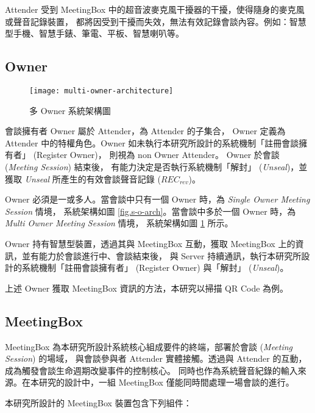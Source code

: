     Attender 受到 MeetingBox 中的超音波麥克風干擾器的干擾，使得隨身的麥克風或聲音記錄裝置，
都將因受到干擾而失效，無法有效記錄會談內容。例如：智慧型手機、智慧手錶、筆電、平板、智慧喇叭等。


\subsection{Owner}

\begin{figure}[H]
    \centering
    \texttt{[image: multi-owner-architecture]}
    \caption{多 Owner 系統架構圖}
    \label{fig.m-o-arch}
\end{figure}

    會談擁有者 Owner 屬於 Attender，為 Attender 的子集合，
Owner 定義為 Attender 中的特權角色。Owner 如未執行本研究所設計的系統機制「註冊會談擁有者」 (Register Owner)，
則視為 non Owner Attender。 Owner 於會談 ({\it Meeting Session}) 結束後，
有能力決定是否執行系統機制「解封」 ({\it Unseal})，並獲取 {\it Unseal} 所產生的有效會談聲音記錄 ($REC_{rev}$)。

    Owner 必須是一或多人。當會談中只有一個 Owner 時，為 {\it Single Owner Meeting Session} 情境，
系統架構如圖 \ref{fig.s-o-arch}。當會談中多於一個 Owner 時，為 {\it Multi Owner Meeting Session} 情境，
系統架構如圖 \ref{fig.m-o-arch} 所示。

    Owner 持有智慧型裝置，透過其與 MeetingBox 互動，獲取 MeetingBox 上的資訊，並有能力於會談進行中、會談結束後，
與 Server 持續通訊，執行本研究所設計的系統機制「註冊會談擁有者」 (Register Owner) 與「解封」 ({\it Unseal})。

    上述 Owner 獲取 MeetingBox 資訊的方法，本研究以掃描 QR Code 為例。


\subsection{MeetingBox}

    MeetingBox 為本研究所設計系統核心組成要件的終端，部署於會談 ({\it Meeting Session}) 的場域，
與會談參與者 Attender 實體接觸。透過與 Attender 的互動，成為觸發會談生命週期改變事件的控制核心。
同時也作為系統聲音紀錄的輸入來源。在本研究的設計中，一組 MeetingBox 僅能同時間處理一場會談的進行。

    本研究所設計的 MeetingBox 裝置包含下列組件：

